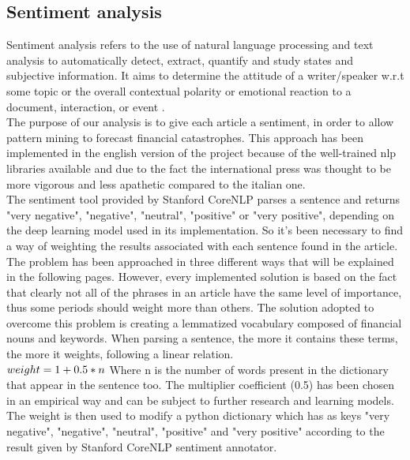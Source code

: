 \subsection{Sentiment analysis}
Sentiment analysis refers to the use of natural language processing and text analysis to automatically detect, extract, quantify and study states and subjective information. It aims to determine the attitude of a writer/speaker w.r.t some topic or the overall contextual polarity or emotional reaction to a document, interaction, or event \cite{sentimentwiki}. \\
The purpose of our analysis is to give each article a sentiment, in order to allow pattern mining to forecast financial catastrophes. This approach has been implemented in the english version of the project because of the well-trained nlp libraries available and due to the fact the international press was thought to be more vigorous and less apathetic compared to the italian one. \\
The sentiment tool provided by Stanford CoreNLP parses a sentence and returns "very negative", "negative", "neutral", "positive" or "very positive", depending on the deep learning model \cite{sentimentdeep} used in its implementation. So it's been necessary to find a way of weighting the results associated with each sentence found in the article. \\
The problem has been approached in three different ways that will be explained in the following pages.
However, every implemented solution is based on the fact that clearly not all of the phrases in an article have the same level of importance, thus some periods should weight more than others. The solution adopted to overcome this problem is creating a lemmatized vocabulary composed of financial nouns and keywords. When parsing a sentence, the more it contains these terms, the more it weights, following a linear relation. \\
\begin{math}
weight = 1 + 0.5*n \\
\end{math}
Where n is the number of words present in the dictionary that appear in the sentence too.
The multiplier coefficient (0.5) has been chosen in an empirical way and can be subject to further research and learning models. \\
The weight is then used to modify a python dictionary which has as keys "very negative", "negative", "neutral", "positive" and "very positive" according to the result given by Stanford CoreNLP sentiment annotator. 


